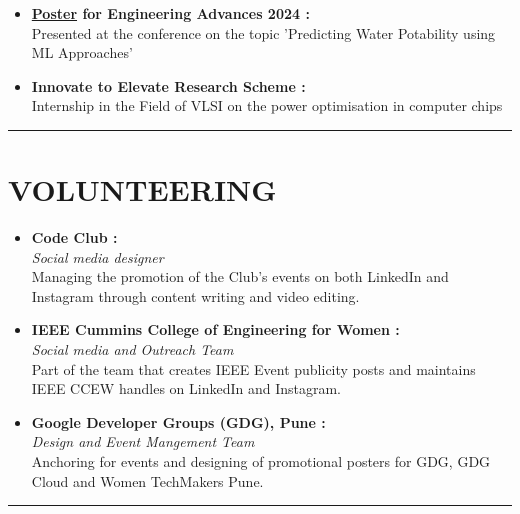 \documentclass[a4paper,10pt]{article}
\begin{document}
\begin{paracol}{2}
\begin{itemize}
		\item \textbf{\href{https://drive.google.com/file/d/1J5h5wK-NsolEpNHerocv-4T25yTHo-_N/view?usp=sharing}{Poster} for Engineering Advances 2024 : }\\
		Presented at the conference on the topic 'Predicting Water Potability using ML Approaches'
		
		\item \textbf{Innovate to Elevate Research Scheme : }\\
		Internship in the Field of VLSI on the power optimisation in computer chips
		
		\end{itemize}
		\vspace{1em}
	
	\hrule
	\section*{VOLUNTEERING}
		\begin{itemize}
			\item \textbf{Code Club :} \\ \textit{Social media designer} \\
			Managing the promotion of the Club's events on both LinkedIn and Instagram through content writing and video editing.
			\item \textbf{IEEE Cummins College of Engineering for Women :} \\ \textit{Social media and Outreach Team} \\
			Part of the team that creates IEEE Event publicity posts and maintains IEEE CCEW handles on LinkedIn and Instagram.
			\item \textbf{Google Developer Groups (GDG), Pune :} \\ \textit{Design and Event Mangement Team} \\
			Anchoring for events and designing of promotional posters for GDG, GDG Cloud and Women TechMakers Pune.
		\end{itemize}
		\vspace{1em}

	\hrule

\end{paracol}
\end{document}
